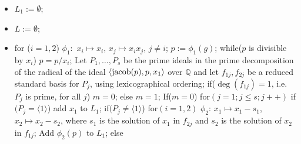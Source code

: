 \documentclass{amsproc}
\begin{document}
\begin{itemize}
\item $L_1:=\emptyset$;
\item $L:=\emptyset$;
\item for ($i=1,2$)\newline
\phantom{}\quad $\phi_1:$ $x_i\mapsto x_i$, $x_j\mapsto x_ix_j$, $j\neq i$;\newline
\phantom{}\quad $p:=\phi_1(g)$;\newline
\phantom{}\quad while($p$ is divisible by $x_i$)\newline
\phantom{}\quad\quad $p=p/x_i$;\newline
\phantom{}\quad Let $P_1,\ldots,P_s$ be the prime ideals in the prime decomposition\newline
\phantom{}\quad of the radical of the ideal $\langle\textnormal{jacob}(p),p,x_1\rangle$ over $\mathbb Q$ and let\newline
\phantom{}\quad $f_{1j}, f_{2j}$ be a reduced standard basis for $P_j$, using lexicographical \newline
\phantom{}\quad ordering;\newline
\phantom{}\quad\quad if($\deg(f_{1j})=1$, i.e.~$P_j$ is prime, for all $j$)\newline
\phantom{}\quad\quad\quad $m=0$;\newline
\phantom{}\quad\quad else\newline
\phantom{}\quad\quad\quad $m=1$;\newline
\phantom{}\quad\quad If($m=0$)\newline
\phantom{}\quad\quad\quad for$(j=1; j\le s;j++)$\newline
\phantom{}\quad\quad\quad\quad if$(P_j=\langle 1\rangle$)\newline
\phantom{}\quad\quad\quad\quad\quad add $x_1$ to $L_1$;\newline
\phantom{}\quad\quad\quad\quad if$(P_j\neq\langle 1\rangle$)\newline
\phantom{}\quad\quad\quad\quad\quad for$(i=1,2)$\newline
\phantom{}\quad\quad\quad\quad\quad\quad $\phi_2$: $x_1\mapsto x_1-s_1$, $x_2\mapsto x_2-s_2$, where $s_1$ is the solution of  \newline
\phantom{}\quad\quad\quad\quad\quad\quad $x_1$ in $f_{2j}$ and $s_2$ is the solution of $x_2$ in $f_{1j}$;\newline
\phantom{}\quad\quad\quad\quad\quad\quad Add $\phi_2(p)$ to $L_1$;\newline
\phantom{}\quad\quad else\newline

\end{itemize}
\end{document}
